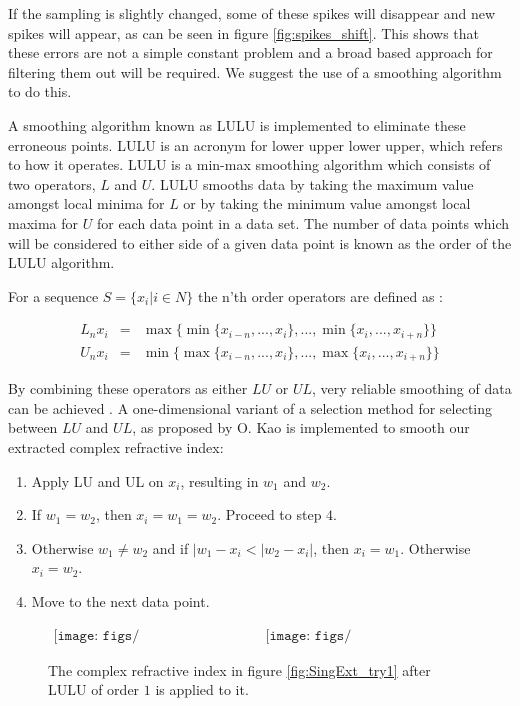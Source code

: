 If the sampling is slightly changed, some of these spikes will disappear and new spikes will appear, as can be seen in figure \ref{fig:spikes_shift}. This shows that these errors are not a simple constant problem and a broad based approach for filtering them out will be required. We suggest the use of a smoothing algorithm to do this.

A smoothing algorithm known as LULU is implemented to eliminate these erroneous points. LULU is an acronym for lower upper lower upper, which refers to how it operates. LULU is a min-max smoothing algorithm which consists of two operators, $L$ and $U$. LULU smooths data by taking the maximum value amongst local minima for $L$ or by taking the minimum value amongst local maxima for $U$ for each data point in a data set. The number of data points which will be considered to either side of a given data point is known as the order of the LULU algorithm.

 For a sequence $S = \{x_{i}|i\in N\}$ the n'th order operators are defined as \cite{Jankowitz2007}:

\begin{eqnarray}
L_{n}x_{i} &=& \max\{\min\{x_{i-n},...,x_{i}\},..., \min\{x_{i},...,x_{i+n}\}\}\\
U_{n}x_{i} &=& \min\{\max\{x_{i-n},...,x_{i}\},..., \max\{x_{i},...,x_{i+n}\}\}
\label{eq:LU}
\end{eqnarray}

By combining these operators as either $LU$ or $UL$, very reliable smoothing of data can be achieved \cite{kao.2001.lulu}. A one-dimensional variant of a selection method for selecting between $LU$ and $UL$, as proposed by O. Kao \cite{kao.2001.lulu} is implemented to smooth our extracted complex refractive index:

\begin{enumerate}
	\item Apply LU and UL on $x_{i}$, resulting in $w_{1}$ and $w_{2}$.
	\item If $w_{1} = w_{2}$, then $x_{i} = w_{1} = w_{2}$. Proceed to step $4$. 
	\item Otherwise $w_{1} \neq w_{2}$ and if $|w_{1}-x_{i}<|w_{2}-x_{i}|$, then $x_{i} = w_{1}$.
	Otherwise $x_{i} = w_{2}$.
	\item Move to the next data point.
\end{enumerate}

\begin{figure}[H]
                \begin{center}$
								\begin{array}{cc}
                \texttt{[image: figs/Single\_n\_2\_d\_LULU\_1.png]}&
                \texttt{[image: figs/Single\_k\_2\_d\_LULU\_1.png]}
								\end{array}$
								\end{center}
	\caption[Extracted complex refractive index for single layer isotropic example with LULU]{The complex refractive index in figure \ref{fig:SingExt_try1} after LULU of order $1$ is applied to it.}
	\label{fig:SingExt_LULU}
\end{figure}

